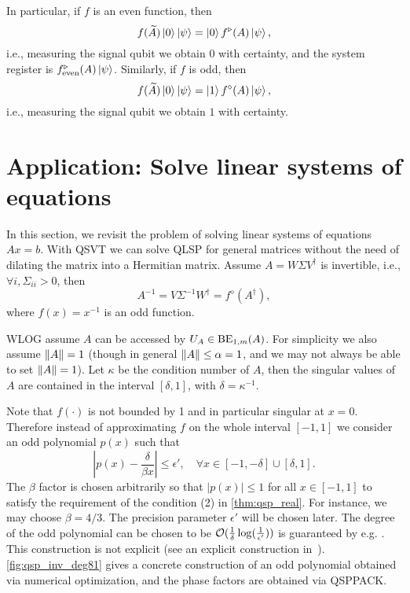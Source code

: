 In particular, if $f$ is an even function, then 
\begin{equation}
f(\widetilde{A})\ket{0}\ket{\psi}=\ket{0}f^{\triangleright}(A)\ket{\psi},
\end{equation}
i.e., measuring the signal qubit we obtain $0$ with certainty, and the system register is $f^{\triangleright}_{\mathrm{even}}(A)\ket{\psi}$.
Similarly, if $f$ is odd, then
\begin{equation}
f(\widetilde{A})\ket{0}\ket{\psi}=\ket{1}f^{\diamond}(A)\ket{\psi},
\end{equation}
i.e., measuring the signal qubit we obtain $1$ with certainty.


\section{Application: Solve linear systems of equations}\label{sec:appqsvt_qlsp}

In this section, we revisit the problem of solving linear systems of equations $Ax=b$. With QSVT we can solve QLSP for general matrices without the need of dilating the matrix into a Hermitian matrix.
Assume $A=W\Sigma V^{\dag}$ is invertible, i.e., $\forall i, \Sigma_{ii}>0$, then
\begin{equation}
A^{-1}=V \Sigma^{-1} W^\dagger=f^{\diamond}(A^\dagger),
\label{eqn:ainv_qsvt}
\end{equation}
where $f(x)=x^{-1}$ is an odd function. 


WLOG assume $A$ can be accessed by $U_A\in\operatorname{BE}_{1,m}(A)$. For simplicity we also assume $\left\lVert A\right\rVert=1$ (though in general $\left\lVert A\right\rVert\le \alpha=1$, and we may not always be able to set $\left\lVert A\right\rVert=1$).
Let $\kappa$ be the condition number of $A$, then the singular values of $A$ are contained in the interval $[\delta,1]$, with $\delta =\kappa^{-1}$.

Note that $f(\cdot)$  is not bounded by 1 and in particular singular at $x=0$. Therefore instead of approximating $f$ on the whole interval $[-1,1]$ we consider an odd polynomial $p(x)$ such that
\begin{equation}
\left|p(x)-\frac{\delta}{\beta x}\right|\leq \epsilon',\quad \forall x\in [-1,-\delta]\cup[\delta,1].
\end{equation}
The $\beta$ factor is chosen arbitrarily so that $|p(x)|\leq 1$ for all $x\in[-1,1]$ to satisfy the requirement of the condition (2) in \cref{thm:qsp_real}. For instance, we may choose $\beta=4/3$. The precision parameter $\epsilon'$ will be chosen later.
The degree of the odd polynomial can be chosen to be $\mathcal{O}(\frac{1}{\delta}\log(\frac{1}{\epsilon'}))$ is guaranteed by e.g. \cite[Corollary 69]{GilyenSuLowEtAl2018}.
This construction is not explicit (see an explicit construction in~\cite{ChildsKothariSomma2017}).
\cref{fig:qsp_inv_deg81} gives a concrete construction of an odd polynomial obtained via numerical optimization, and the phase factors are obtained via QSPPACK.


